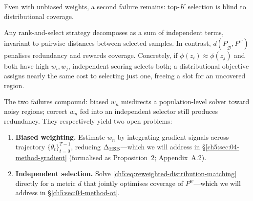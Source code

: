 \begin{foldable} %
    Even with unbiased weights, a second failure remains: top-$K$ selection is blind to distributional coverage.
    \begin{remark}
        Any rank-and-select strategy decomposes as a sum of independent terms, invariant to pairwise distances between selected samples.
        In contrast, $d(P_{\tilde{\mathcal{D}}}, P^w)$ penalises redundancy and rewards coverage.
        Concretely, if $\phi(z_i) \approx \phi(z_j)$ and both have high $w_i, w_j$, independent scoring selects both; a distributional objective assigns nearly the same cost to selecting just one, freeing a slot for an uncovered region.
    \end{remark}
\end{foldable}

\begin{foldable} %
    The two failures compound: biased $w_n$ misdirects a population-level solver toward noisy regions; correct $w_n$ fed into an independent selector still produces redundancy.
    They respectively yield two open problems:
    \begin{enumerate}
        \item \textbf{Biased weighting.} Estimate $w_n$ by integrating gradient signals across trajectory $\{\theta_t\}_{t=0}^{T-1}$, reducing $\Delta_\textup{HSB}$---which we will address in \S\ref{ch5:sec:04-method-gradient} (formalised as Proposition~2; Appendix~A.2).
        \item \textbf{Independent selection.} Solve \eqref{ch5:eq:reweighted-distribution-matching} directly for a metric $d$ that jointly optimises coverage of $P^w$---which we will address in \S\ref{ch5:sec:04-method-ot}.
    \end{enumerate}
\end{foldable}
